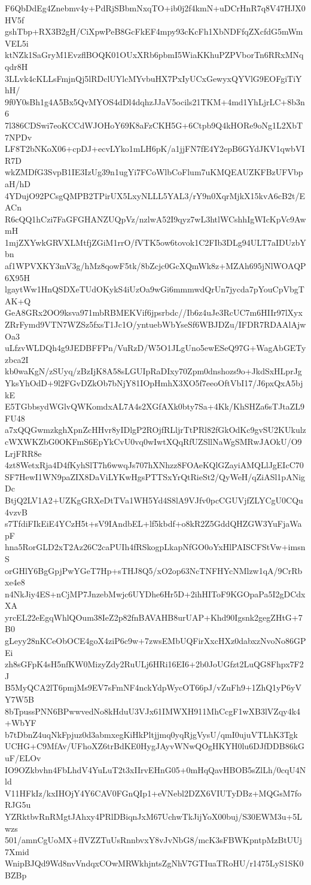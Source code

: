 F6QbDdEg4Znebmv4y+PdRjSBbmNxqTO+ib0j2f4kmN+uDCrHnR7q8V47HJX0HV5f
gshTbp+RX3B2gH/CiXpwPeB8GcFkEF4mpy93cKcFh1XbNDFfqZXcfdG5mWmVEL5i
ktNZk1SaGryM1EvzflBOQK01OUxXRb6pbmI5WiaKKhuPZPVborTn6RRxMNqqdr8H
3LLvk4cKLLsFmjnQj5lRDclUYlcMYvbuHX7PxIyUCxGewyxQYVlG9EOFgiTiYhH/
9f0Y0sBh1g4A5Bx5QvMYOS4dDl4dqhzJJaV5ocils21TKM+4md1YhLjrLC+8b3n6
7l386CDSwi7eoKCCdWJOHoY69K8aFzCKH5G+6Ctpb9Q4kHORe9oNg1L2XbT7NPDv
LF8T2bNKoX06+cpDJ+ecvLYko1mLH6pK/a1jjFN7fE4Y2epB6GYdJKV1qwbVIR7D
wkZMDfG3SvpB1IE3IzUg39n1ugYi7FCoWlbCoFlum7uKMQEAUZKFBzUFVbpaH/hD
4YDujO92PCsgQMPB2TPirUX5LxyNLLL5YAL3/rY9n0XqrMjkX15kvA6cB2t/EACn
R6cQQ1hCzi7FaGFGHANZUQpVz/nzlwA52I9qyz7wL3htlWCshhIgWIcKpVc9AwmH
1mjZXYwkGRVXLMtfjZGiM1rrO/fVTK5ow6tovok1C2FIb3DLg94ULT7aIDUzbYbn
af1WPVXKY3mV3g/hMz8qowF5tk/8bZcjc0GcXQmWk8z+MZAh695jNlWOAQP6X95H
lgaytWw1HnQSDXeTUdOKykS4iUzOa9wGi6mmmwdQrUn7jycda7pYouCpVbgTAK+Q
GeA8GRx2OO9ksva971mbRBMEKVif6jpsrbdc//Ib6z4uJe3RcUC7m6HIIr97lXyx
ZRrFymd9VTN7WZSz5fxsT1Jc1O/yntuebWbYseSf6WBJDZu/IFDR7RDAAlAjwOa3
uLfzvWLDQh4g9JEDBFFPn/VuRzD/W5O1JLgUno5ewESeQ97G+WagAbGETyzbca2I
kb0waKgN/zSUyq/zBzIjK8A58sLGUIpRaDIxy70Zpm0dnshozs9o+JkdSxHLprJg
YksYhOdD+9l2FGvDZkOb7bNjY81IOpHmhX3XO5f7eeoOftVbI17/J6pxQxA5bjkE
E5TGbbsydWGlvQWKomdxAL7A4s2XGfAXk0bty7Sa+4Kk/KhSHZa6sTJtaZL9FU48
a7xQQGwmzkghXpnZcHHvr8yIDlgP2ROjfRLljrTtPRl82fGkOdKc9gvSU2KUkulz
cWXWKZbG0OKFmS6EpYkCvU0vq0wIwtXQqRfUZSllNaWgSMRwJAOkU/O9LrjFRR8e
4zt8WetxRja4D4fKyhSlT7h6wwqJs707hXNhzz8FOAeKQlGZayiAMQLlJgEIcC70
SF7HewI1WN9paZIX8DaViLYKwHgsPTTSxYrQtRieSt2/QyWeH/qZiASl1pANigDc
BtjQ2LV1A2+UZKgGRXeDtTVa1WH5Yd4S8lA9VJfv0pcCGUVjfZLYCgU0CQu4vzvB
s7TfdiFIkEiE4YCzH5t+sV9IAndbEL+lf5kbdf+o8kR2Z5GddQHZGW3YuFjaWapF
hna5RorGLD2xT2Az26C2caPUIh4fRSkogpLkapNfGO0oYxHlPAISCFStVw+imsnS
orGHlY6BgGpjPwYGeT7Hp+sTHJ8Q5/xO2op63NcTNFHYcNMlzw1qA/9CrRbxe4e8
n4NkJiy4ES+nCjMP7JnzebMwjc6UYDhe6Hr5D+2ihHIToF9KGOpaPa5I2gDCdxXA
yrcEL22eEgqWhlQOum38IeZ2p82fnBAVAHB8urUAP+Khd90Igsnk2gegZHtG+7B0
gLeyy28nKCeObOCE4goX4ziP6c9w+7zwsEMbUQFirXxcHXz0dabxzNvoNo86GPEi
zh8sGFpK4sH5nfKW0MizyZdy2RuULj6HRi16EI6+2b0JoUGfzt2LuQG8Fhpx7F2J
B5MyQCA2lT6pmjMs9EV7sFmNF4nckYdpWycOT66pJ/vZuFh9+1ZhQ1yP6yVY7W5B
8bTpussPNN6BPwwvedNo8kHduU3VJx61IMWXH911MhCcgF1wXB3lVZqy4k4+WbYF
b7tDbnZ4uqNkFpjuz0d3abmxegKiHkPltjjmq0yqRjgVysU/qmI0ujuVTLhK3Tgk
UCHG+C9MfAv/UFhoXZ6trBdKE0HygJAyvWNwQOgHKYH0lu6DJfDDB86kGuF/ELOv
IO9OZkbvhn4FbLhdV4YuLuT2t3xIIrvEHnG05+0mHqQavHBOB5sZlLh/0cqU4Nld
V11HFkIz/kxIHOjY4Y6CAV0FGnQIp1+eVNebl2DZX6VIUTyDBz+MQGsM7foRJG5u
YZRktbvRnRMgtJAhxy4PRlDBiqnJxM67UchwTkJijYoX00buj/S30EWM3u+5Lwzs
501/amnCgUoMX+fIVZZTuUsRnnbvxY8vJvNbG8/mcK3sFBWKpntpMzBtUUj7Xmid
WnipBJQd9Wd8nvVndqxCOwMRWkhjntsZgNhV7GTIuaTRoHU/r1475LyS1SK0BZBp
